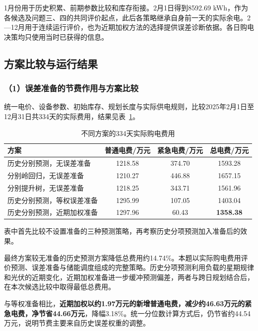 1月份用于历史积累、前期参数比较和库存衔接。2月1日得到8592.69 kWh，作为各候选及问题三、四的共同评价起点，此后各策略继承自身前一天的实际余电。2—12月用于连续运行评价，也为近期加权方法的选择提供误差诊断依据。各日购电决策均只使用当时已获得的信息。

\subsection{方案比较与运行结果}
\subsubsection*{（1）误差准备的节费作用与方案比较}
统一电价、设备参数、初始库存、规划长度与实际供电规则，比较2025年2月1日至12月31日共334天的实际费用，结果见表~\ref{tab:q2_model_compare}。

\begin{table}[!htbp]
\centering
\caption{不同方案的334天实际购电费用}
\label{tab:q2_model_compare}
\begin{tabular}{lccc}
\hline
方案 & 普通电费/万元 & 紧急电费/万元 & 总电费/万元 \\
\hline
历史分别预测，无误差准备
& 1218.58 & 374.70 & 1593.28 \\
分别岭回归，无误差准备
& 1210.27 & 446.88 & 1657.15 \\
分别提升树，无误差准备
& 1218.25 & 343.71 & 1561.96 \\
历史分别预测，等权误差准备
& 1295.99 & 107.05 & 1403.04 \\
历史分别预测，近期加权准备
& 1297.96 & 60.43 & \textbf{1358.38} \\
\hline
\end{tabular}
\end{table}

表中首先比较不设置准备的三种预测策略，再考察历史分项预测加入准备后的效果。

\begin{samepage}
最终方案较无准备的历史预测方案降低总费用约14.74\%。本题以实际购电费用评价预测、误差准备与储能调度组成的完整策略。历史分项预测利用负载的星期规律和光伏的近期变化，近期加权准备进一步缓冲预测偏差，两者与跨日规划结合后，在本次候选比较中取得最低总费用。
\par\end{samepage}

与等权准备相比，\textbf{近期加权以约1.97万元的新增普通电费，减少约46.63万元的紧急电费，净节省44.66万元}，降幅3.18\%。统一分位数计算方式后，仍节省约44.54万元，说明节费主要来自历史误差权重的调整。

